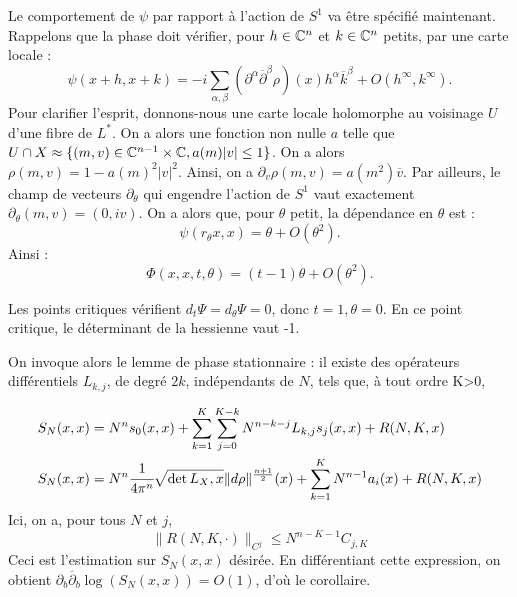 Le comportement de $\psi$ par rapport à l'action de $S^1$ va être spécifié maintenant. Rappelons que la phase doit vérifier, pour $h\in \mathbb{C}^n$ et $k \in \mathbb{C}^n$ petits, par une carte locale :
\begin{equation}
  \psi(x+h,x+k) =-i\sum_{\alpha,\beta}(\partial^{\alpha}\overline{\partial}^{\beta}\rho)(x)h^{\alpha}\overline{k}^{\beta} + O(h^{\infty},k^{\infty}).
\end{equation}
Pour clarifier l'esprit, donnons-nous une carte locale holomorphe au voisinage $U$ d'une fibre de $L^*$. On a alors une fonction non nulle $a$ telle que $U \cap X \approx \{(m,v)\in \mathbb{C}^{n-1}\times \mathbb{C}, a(m)|v|\leq 1\}$. On a alors $\rho(m,v)=1-a(m)^2|v|^2$. Ainsi, on a $\partial_v \rho(m,v) = a(m^2)\overline{v}$.
Par ailleurs, le champ de vecteurs $\partial_{\theta}$ qui engendre l'action de $S^1$ vaut exactement $\partial_{\theta}(m,v)=(0,iv)$. On a alors que, pour $\theta$ petit, la dépendance en $\theta$ est :
\begin{equation*}
  \psi(r_{\theta} x,x) = \theta + O(\theta^{2}).
\end{equation*}
 Ainsi :
\begin{equation*}
	\Phi(x,x,t,\theta) =(t-1)\theta + O(\theta^2).
\end{equation*}

Les points critiques vérifient $d_t\Psi = d_\theta \Psi =0$, donc $t=1, \theta=0$. En ce point critique, le déterminant de la hessienne vaut -1.

On invoque alors le lemme de phase stationnaire : il existe des opérateurs différentiels $L_{k,j}$, de degré $2k$, indépendants de $N$, tels que, à tout ordre K>0, 

\begin{align*}
	S_N(x,x) &= N^n s_0(x,x) + \sum_{k=1}^{K}\sum_{j=0}^{K-k}N^{n-k-j}L_{k,j}s_j(x,x) + R(N,K,x)\\
		S_N(x,x) &= N^n \cfrac{1}{4\pi^n}\sqrt{\det{L_X,x}}\|d\rho\|^{\frac{n+1}{2}}(x) + \sum_{k=1}^K N^{n-1}a_i(x) + R(N,K,x)
\end{align*}
Ici, on a, pour tous $N$ et $j$,
\begin{equation*}
  \|R(N,K,\cdot)\|_{C^j} \leq N^{n-K-1}C_{j,K}
\end{equation*}
Ceci est l'estimation sur $S_N(x,x)$ désirée. En différentiant cette expression, on obtient $\partial_b\overline{\partial}_b \log(S_N(x,x)) = O(1)$, d'où le corollaire.

